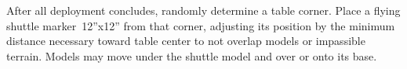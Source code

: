 

\begin{tablesetup}

  \dawnofwar

  \smallskip%
  After all deployment concludes, randomly determine a table corner.
  Place a flying shuttle marker~12''x12'' from that corner, adjusting
  its position by the minimum distance necessary toward table center
  to not overlap models or impassible terrain.  Models may move under
  the shuttle model and over or onto its base.
\end{tablesetup}

